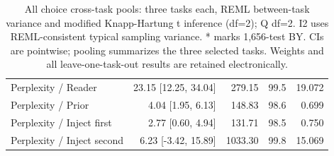 \begin{table}[t]
\begin{tabular}{@{}lrrrr@{}}
Perplexity / Reader & 23.15 [12.25, 34.04] & 279.15 & 99.5 & 19.072 \\
Perplexity / Prior & 4.04 [1.95, 6.13] & 148.83 & 98.6 & 0.699 \\
Perplexity / Inject first & 2.77 [0.60, 4.94] & 131.71 & 98.5 & 0.750 \\
Perplexity / Inject second & 6.23 [-3.42, 15.89] & 1033.30 & 99.8 & 15.069 \\
\bottomrule
\end{tabular}
\caption{All choice cross-task pools: three tasks each, REML between-task variance and modified Knapp-Hartung t inference (df=2); Q df=2. I2 uses REML-consistent typical sampling variance. * marks 1,656-test BY. CIs are pointwise; pooling summarizes the three selected tasks. Weights and all leave-one-task-out results are retained electronically.}
\label{tab:appendix_meta_choice}
\end{table}
